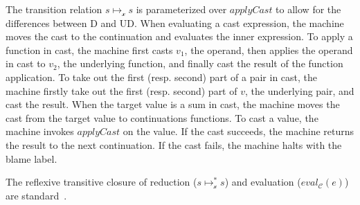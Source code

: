 \documentclass[acmsmall,review,anonymous]{acmart}\settopmatter{printfolios=true,printccs=false,printacmref=false}
\newcommand{\judgeCreduce}[2]{#1 \longmapsto_{\mathcal{x}} #2}
\newcommand{\judgeCreduceTrans}[2]{#1 \longmapsto_{\mathcal{x}}^{*} #2}
\begin{document}
The transition relation $\judgeCreduce{s}{s}$ is parameterized over
$applyCast$ to allow for the differences between D and UD.
%
When evaluating a cast expression, the machine moves the cast to the
continuation and evaluates the inner expression.
To apply a function in cast, the machine first casts $v_1$, the
operand, then applies the operand in cast to $v_2$, the underlying
function, and finally cast the result of the function application.
%
To take out the first (resp. second) part of a pair in cast, the
machine firstly take out the first (resp. second) part of $v$, the
underlying pair, and cast the result.
%
%
When the target value is a sum in cast, the machine moves the cast from
the target value to continuations functions.
%
To cast a value, the machine invokes $applyCast$ on the value.  If the
cast succeeds, the machine returns the result to the next
continuation.  If the cast fails, the machine halts with the blame
label.
%

The reflexive transitive closure of reduction ($\judgeCreduceTrans{s}{s}$) and 
evaluation ($eval_\mathcal{C}(e)$)
are standard~\citep{felleisen03:_pllc}.
\end{document}
